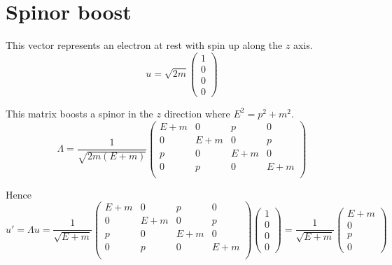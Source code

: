 



\section*{Spinor boost}

This vector represents an electron at rest with spin up along the $z$ axis.
\begin{equation*}
u=\sqrt{2m}\begin{pmatrix}1\\0\\0\\0\end{pmatrix}
\end{equation*}

This matrix boosts a spinor in the $z$ direction where $E^2=p^2+m^2$.
\begin{equation*}
\Lambda=\frac{1}{\sqrt{2m(E+m)}}
\begin{pmatrix}
E+m & 0 & p & 0\\
0 & E+m & 0 & p\\
p & 0 & E+m & 0\\
0 & p & 0 & E+m\\
\end{pmatrix}
\end{equation*}

Hence
\begin{equation*}
u'=\Lambda u=\frac{1}{\sqrt{E+m}}
\begin{pmatrix}
E+m & 0 & p & 0\\
0 & E+m & 0 & p\\
p & 0 & E+m & 0\\
0 & p & 0 & E+m\\
\end{pmatrix}
\begin{pmatrix}1\\0\\0\\0\end{pmatrix}
=\frac{1}{\sqrt{E+m}}\begin{pmatrix}E+m\\0\\p\\0\end{pmatrix}
\end{equation*}


